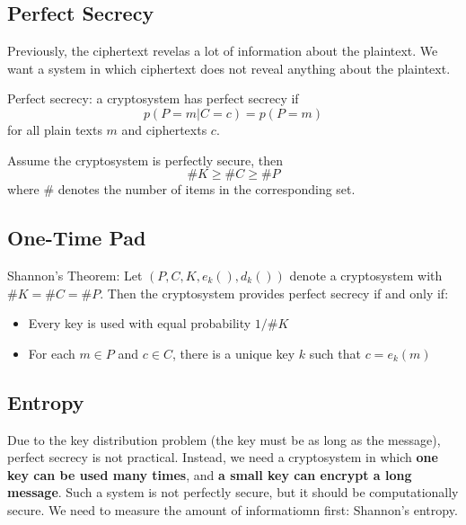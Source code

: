 \subsection{Perfect Secrecy}
Previously, the ciphertext revelas a lot of information about the plaintext. We want a system in which ciphertext does not reveal anything about the plaintext. 

\begin{defn}
    Perfect secrecy: a cryptosystem has perfect secrecy if \[ p(P=m | C=c) = p(P=m) \] for all plain texts $m$ and ciphertexts $c$.
\end{defn}

\begin{lem}
    Assume the cryptosystem is perfectly secure, then 
    \[ \#K \geq \#C \geq \#P\] where $\#$ denotes the number of items in the corresponding set. 
\end{lem}

\subsection{One-Time Pad}

\begin{thm}
    Shannon's Theorem: Let $(P, C, K, e_k(), d_k())$ denote a cryptosystem with \( \#K = \#C = \#P\). Then the cryptosystem provides perfect secrecy if and only if:
    \begin{itemize}
        \item Every key is used with equal probability $1/\#K$
        \item For each $m \in P$ and $c \in C$, there is a unique key $k$ such that $c = e_k(m)$
    \end{itemize}
\end{thm}


\subsection{Entropy}
Due to the key distribution problem (the key must be as long as the message), perfect secrecy is not practical. Instead, we need a cryptosystem in which \textbf{one key can be used many times}, and \textbf{a  small key can encrypt a long message}. Such a system is not perfectly secure, but it should be computationally secure. We need to measure the amount of informatiomn first: Shannon's entropy. \\

